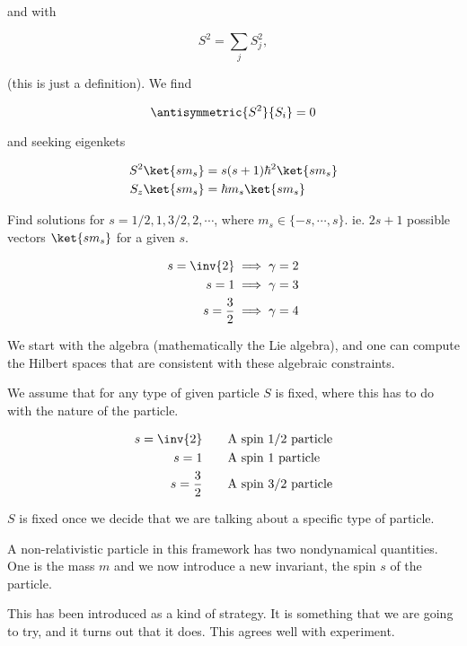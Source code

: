 and with 

\begin{equation}\label{eqn:qmTwoL13:350}
S^2 = \sum_j S_j^2,
\end{equation}

(this is just a definition).  We find

\begin{equation}\label{eqn:qmTwoL13:370}
\antisymmetric{S^2}{S_i} = 0
\end{equation}

and seeking eigenkets

\begin{align}\label{eqn:qmTwoL13:390}
S^2 \ket{s m_s} &= s(s+1) \hbar^2 \ket{s m_s} \\
S_z \ket{s m_s} &= \hbar m_s \ket{s m_s}
\end{align}

Find solutions for $s = 1/2, 1, 3/2, 2, \cdots$, where $m_s \in \{-s, \cdots, s\}$.  ie.  $2 s + 1$ possible vectors $\ket{s m_s}$ for a given $s$.

\begin{align*}
s = \inv{2} &\implies \gamma = 2 \\
s = 1 &\implies \gamma = 3 \\
s = \frac{3}{2} &\implies \gamma = 4 
\end{align*}

We start with the algebra (mathematically the Lie algebra), and one can compute the Hilbert spaces that are consistent with these algebraic constraints.

We assume that for any type of given particle $S$ is fixed, where this has to do with the nature of the particle.

\begin{align*}
s = \inv{2} &\qquad \text{A spin $1/2$ particle} \\
s = 1 &\qquad \text{A spin $1$ particle} \\
s = \frac{3}{2} &\qquad \text{A spin $3/2$ particle}
\end{align*}

$S$ is fixed once we decide that we are talking about a specific type of particle.

A non-relativistic particle in this framework has two nondynamical quantities.  One is the mass $m$ and we now introduce a new invariant, the spin $s$ of the particle.

This has been introduced as a kind of strategy.  It is something that we are going to try, and it turns out that it does.  This agrees well with experiment.

